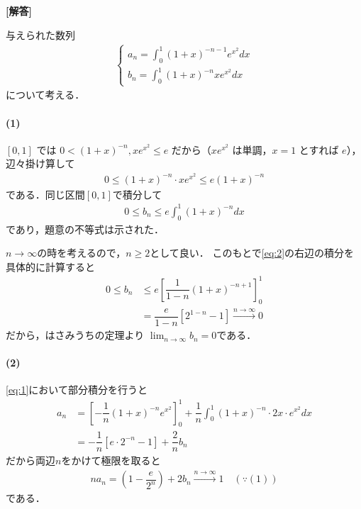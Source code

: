 \documentclass[../../main.tex]{subfiles}
\begin{document}
\begin{oframed}
  
\end{oframed}

{\bf [解答]}

与えられた数列
\begin{align}
  \begin{cases}
    a_n=\int_0^1{(1+x)}^{-n-1}e^{x^2}dx \\
    b_n=\int_0^1{(1+x)}^{-n}xe^{x^2}dx
  \end{cases} \label{eq:1}
\end{align}
について考える．

\paragraph{(1)}

$[0, 1]$ では $0 < (1+x)^{-n}, x e^{x^2} \le e$ だから（$x e^{x^2}$ は単調，$x=1$ とすれば $e$），辺々掛け算して
\begin{align}
  0 \le (1+x)^{-n} \cdot x e^{x^2} \le e(1+x)^{-n}
\end{align}
である．同じ区間$[0,1]$で積分して
\begin{align}
  0 \le b_n \le e \int_0^1 (1+x)^{-n} dx \label{eq:2}
\end{align}
であり，題意の不等式は示された．

$n\to\infty$の時を考えるので，$n \ge 2$として良い．
このもとで\cref{eq:2}の右辺の積分を具体的に計算すると
\begin{align}
  0 \le b_n &\le e \left[ \dfrac{1}{1-n}(1+x)^{-n+1} \right]_0^1 \\
  &= \dfrac{e}{1-n} \left[ 2^{1-n} - 1 \right] \xrightarrow{n\to\infty} 0
\end{align}
だから，はさみうちの定理より $\lim_{n \to \infty} b_n = 0$である．

\paragraph{(2)}

\cref{eq:1}において部分積分を行うと
\begin{align}
  a_n
  &= \left[ -\dfrac{1}{n}(1+x)^{-n} e^{x^2} \right]_0^1 + \dfrac{1}{n} \int_0^1 (1+x)^{-n} \cdot 2x \cdot e^{x^2} dx \\
  &= -\dfrac{1}{n} \left[ e \cdot 2^{-n} - 1 \right] + \dfrac{2}{n} b_n
\end{align}
だから両辺$n$をかけて極限を取ると
\begin{align}
  n a_n = \left( 1 - \dfrac{e}{2^n} \right) + 2 b_n \xrightarrow{n\to\infty} 1 \quad (\because (1))
\end{align}
である．
\end{document}
